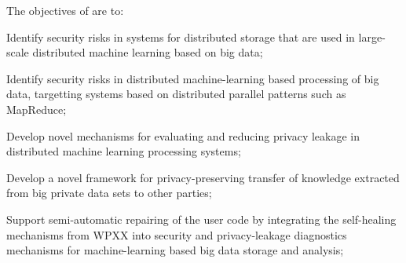 \addtocounter{wpno}{1}
\begin{Workpackage}{\thewpno}
\WPTitle{\wpname{\thewpno}}


\begin{WPObjectives}
The objectives of \theWP{} are to:
\begin{compactitem}
\item Identify security risks in systems for distributed storage that are used in large-scale distributed machine learning based on big data;
\item Identify security risks in distributed machine-learning based processing of big data, targetting systems based on distributed parallel patterns such as MapReduce;
\item Develop novel mechanisms for evaluating and reducing privacy leakage in distributed machine learning processing systems;
\item Develop a novel framework for privacy-preserving transfer of knowledge extracted from big private data sets to other parties;
\item Support semi-automatic repairing of the user code by integrating the self-healing mechanisms from WPXX into security and privacy-leakage diagnostics mechanisms for machine-learning based big data storage and analysis;
\end{compactitem}
\end{WPObjectives}


\end{Workpackage}
